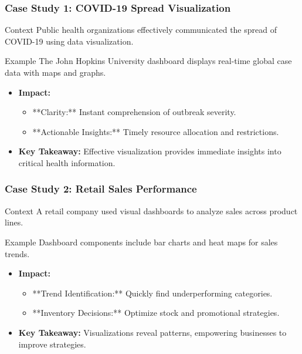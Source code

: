 \documentclass[aspectratio=169]{beamer}
\begin{document}
\begin{frame}[fragile]
    \frametitle{Case Study 1: COVID-19 Spread Visualization}
    \begin{block}{Context}
        Public health organizations effectively communicated the spread of COVID-19 using data visualization.
    \end{block}
    \begin{block}{Example}
        The John Hopkins University dashboard displays real-time global case data with maps and graphs.
    \end{block}
    \begin{itemize}
        \item \textbf{Impact:}
            \begin{itemize}
                \item **Clarity:** Instant comprehension of outbreak severity.
                \item **Actionable Insights:** Timely resource allocation and restrictions.
            \end{itemize}
        \item \textbf{Key Takeaway:} Effective visualization provides immediate insights into critical health information.
    \end{itemize}
\end{frame}

\begin{frame}[fragile]
    \frametitle{Case Study 2: Retail Sales Performance}
    \begin{block}{Context}
        A retail company used visual dashboards to analyze sales across product lines.
    \end{block}
    \begin{block}{Example}
        Dashboard components include bar charts and heat maps for sales trends.
    \end{block}
    \begin{itemize}
        \item \textbf{Impact:}
            \begin{itemize}
                \item **Trend Identification:** Quickly find underperforming categories.
                \item **Inventory Decisions:** Optimize stock and promotional strategies.
            \end{itemize}
        \item \textbf{Key Takeaway:} Visualizations reveal patterns, empowering businesses to improve strategies.
    \end{itemize}
\end{frame}
\end{document}
